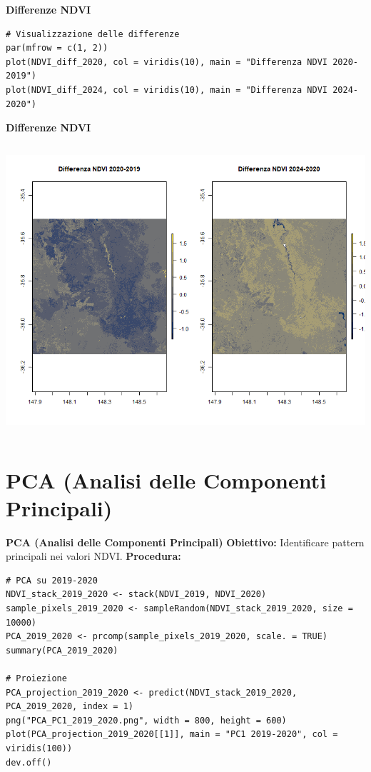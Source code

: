 \documentclass{beamer}
\begin{document}
\begin{frame}[fragile]{\textbf{Differenze NDVI}}
\begin{lstlisting}
# Visualizzazione delle differenze
par(mfrow = c(1, 2))
plot(NDVI_diff_2020, col = viridis(10), main = "Differenza NDVI 2020-2019")
plot(NDVI_diff_2024, col = viridis(10), main = "Differenza NDVI 2024-2020")
\end{lstlisting}
\end{frame}

\begin{frame}{\textbf{Differenze NDVI}}
\begin{columns}
    \centering
    \includegraphics[width=\textwidth]{NDVI_diff.png}
\end{columns}
\end{frame}

\section{PCA (Analisi delle Componenti Principali)}

\begin{frame}[fragile]{\textbf{PCA (Analisi delle Componenti Principali)}}
\textbf{Obiettivo:} Identificare pattern principali nei valori NDVI.
\newline
\newline
\textbf{Procedura:}
\begin{lstlisting}
# PCA su 2019-2020
NDVI_stack_2019_2020 <- stack(NDVI_2019, NDVI_2020)
sample_pixels_2019_2020 <- sampleRandom(NDVI_stack_2019_2020, size = 10000)
PCA_2019_2020 <- prcomp(sample_pixels_2019_2020, scale. = TRUE)
summary(PCA_2019_2020)

# Proiezione
PCA_projection_2019_2020 <- predict(NDVI_stack_2019_2020, PCA_2019_2020, index = 1)
png("PCA_PC1_2019_2020.png", width = 800, height = 600)
plot(PCA_projection_2019_2020[[1]], main = "PC1 2019-2020", col = viridis(100))
dev.off()
\end{lstlisting}
\end{frame}
\end{document}
